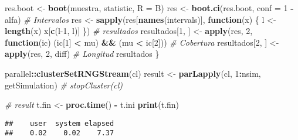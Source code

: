 \documentclass[
]{book}
\newenvironment{Shaded}{\begin{snugshade}}{\end{snugshade}}
\newcommand{\CommentTok}[1]{\textcolor[rgb]{0.56,0.35,0.01}{\textit{#1}}}
\newcommand{\ControlFlowTok}[1]{\textcolor[rgb]{0.13,0.29,0.53}{\textbf{#1}}}
\newcommand{\DataTypeTok}[1]{\textcolor[rgb]{0.13,0.29,0.53}{#1}}
\newcommand{\DecValTok}[1]{\textcolor[rgb]{0.00,0.00,0.81}{#1}}
\newcommand{\KeywordTok}[1]{\textcolor[rgb]{0.13,0.29,0.53}{\textbf{#1}}}
\newcommand{\NormalTok}[1]{#1}
\newcommand{\OperatorTok}[1]{\textcolor[rgb]{0.81,0.36,0.00}{\textbf{#1}}}
\newcommand{\StringTok}[1]{\textcolor[rgb]{0.31,0.60,0.02}{#1}}
\theoremstyle{break}
\theoremstyle{definition}
\theoremstyle{definition}
\theoremstyle{definition}
\theoremstyle{remark}
\begin{document}
\begin{Shaded}
\begin{Highlighting}[]
\NormalTok{    res.boot <-}\StringTok{ }\KeywordTok{boot}\NormalTok{(muestra, statistic, }\DataTypeTok{R =}\NormalTok{ B)}
\NormalTok{    res <-}\StringTok{ }\KeywordTok{boot.ci}\NormalTok{(res.boot, }\DataTypeTok{conf =} \DecValTok{1} \OperatorTok{-}\StringTok{ }\NormalTok{alfa)}
    \CommentTok{# Intervalos}
\NormalTok{    res <-}\StringTok{ }\KeywordTok{sapply}\NormalTok{(res[}\KeywordTok{names}\NormalTok{(intervals)], }\ControlFlowTok{function}\NormalTok{(x) \{}
\NormalTok{      l <-}\StringTok{ }\KeywordTok{length}\NormalTok{(x)}
\NormalTok{      x[}\KeywordTok{c}\NormalTok{(l}\DecValTok{-1}\NormalTok{, l)]}
\NormalTok{    \})}
    \CommentTok{# resultados}
\NormalTok{    resultados[}\DecValTok{1}\NormalTok{, ] <-}\StringTok{ }\KeywordTok{apply}\NormalTok{(res, }\DecValTok{2}\NormalTok{,}
                                   \ControlFlowTok{function}\NormalTok{(ic) (ic[}\DecValTok{1}\NormalTok{] }\OperatorTok{<}\StringTok{ }\NormalTok{mu) }\OperatorTok{&&}\StringTok{ }\NormalTok{(mu }\OperatorTok{<}\StringTok{ }\NormalTok{ic[}\DecValTok{2}\NormalTok{])) }\CommentTok{# Cobertura}
\NormalTok{    resultados[}\DecValTok{2}\NormalTok{, ] <-}\StringTok{ }\KeywordTok{apply}\NormalTok{(res, }\DecValTok{2}\NormalTok{, diff) }\CommentTok{# Longitud}
\NormalTok{    resultados}
\NormalTok{\}}

\NormalTok{parallel}\OperatorTok{::}\KeywordTok{clusterSetRNGStream}\NormalTok{(cl)}
\NormalTok{result <-}\StringTok{ }\KeywordTok{parLapply}\NormalTok{(cl, }\DecValTok{1}\OperatorTok{:}\NormalTok{nsim, getSimulation)}
\CommentTok{# stopCluster(cl)}

\CommentTok{# result}
\NormalTok{t.fin <-}\StringTok{ }\KeywordTok{proc.time}\NormalTok{() }\OperatorTok{-}\StringTok{ }\NormalTok{t.ini}
\KeywordTok{print}\NormalTok{(t.fin)}
\end{Highlighting}
\end{Shaded}

\begin{verbatim}
##    user  system elapsed 
##    0.02    0.02    7.37
\end{verbatim}
\end{document}
